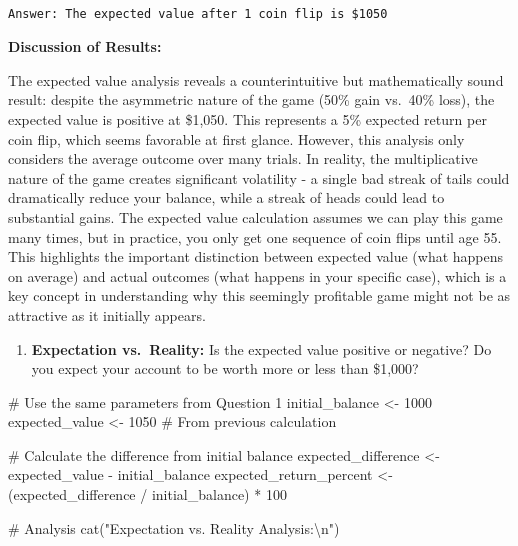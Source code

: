 \documentclass[
  letterpaper,
  DIV=11,
  numbers=noendperiod]{scrartcl}
\newenvironment{Shaded}{\begin{snugshade}}{\end{snugshade}}
\newcommand{\CommentTok}[1]{\textcolor[rgb]{0.37,0.37,0.37}{#1}}
\newcommand{\DecValTok}[1]{\textcolor[rgb]{0.68,0.00,0.00}{#1}}
\newcommand{\FunctionTok}[1]{\textcolor[rgb]{0.28,0.35,0.67}{#1}}
\newcommand{\NormalTok}[1]{\textcolor[rgb]{0.00,0.23,0.31}{#1}}
\newcommand{\OtherTok}[1]{\textcolor[rgb]{0.00,0.23,0.31}{#1}}
\newcommand{\SpecialCharTok}[1]{\textcolor[rgb]{0.37,0.37,0.37}{#1}}
\newcommand{\StringTok}[1]{\textcolor[rgb]{0.13,0.47,0.30}{#1}}
\providecommand{\tightlist}{%
  \setlength{\itemsep}{0pt}\setlength{\parskip}{0pt}}
\begin{document}
\begin{verbatim}

Answer: The expected value after 1 coin flip is $1050
\end{verbatim}

\textbf{Discussion of Results:}

The expected value analysis reveals a counterintuitive but
mathematically sound result: despite the asymmetric nature of the game
(50\% gain vs.~40\% loss), the expected value is positive at \$1,050.
This represents a 5\% expected return per coin flip, which seems
favorable at first glance. However, this analysis only considers the
average outcome over many trials. In reality, the multiplicative nature
of the game creates significant volatility - a single bad streak of
tails could dramatically reduce your balance, while a streak of heads
could lead to substantial gains. The expected value calculation assumes
we can play this game many times, but in practice, you only get one
sequence of coin flips until age 55. This highlights the important
distinction between expected value (what happens on average) and actual
outcomes (what happens in your specific case), which is a key concept in
understanding why this seemingly profitable game might not be as
attractive as it initially appears.

\begin{enumerate}
\def\labelenumi{\arabic{enumi}.}
\setcounter{enumi}{1}
\tightlist
\item
  \textbf{Expectation vs.~Reality:} Is the expected value positive or
  negative? Do you expect your account to be worth more or less than
  \$1,000?
\end{enumerate}

\begin{Shaded}
\begin{Highlighting}[]
\CommentTok{\# Use the same parameters from Question 1}
\NormalTok{initial\_balance }\OtherTok{\textless{}{-}} \DecValTok{1000}
\NormalTok{expected\_value }\OtherTok{\textless{}{-}} \DecValTok{1050}  \CommentTok{\# From previous calculation}

\CommentTok{\# Calculate the difference from initial balance}
\NormalTok{expected\_difference }\OtherTok{\textless{}{-}}\NormalTok{ expected\_value }\SpecialCharTok{{-}}\NormalTok{ initial\_balance}
\NormalTok{expected\_return\_percent }\OtherTok{\textless{}{-}}\NormalTok{ (expected\_difference }\SpecialCharTok{/}\NormalTok{ initial\_balance) }\SpecialCharTok{*} \DecValTok{100}

\CommentTok{\# Analysis}
\FunctionTok{cat}\NormalTok{(}\StringTok{"Expectation vs. Reality Analysis:}\SpecialCharTok{\textbackslash{}n}\StringTok{"}\NormalTok{)}
\end{Highlighting}
\end{Shaded}
\end{document}
